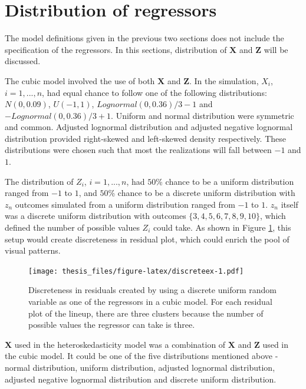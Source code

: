 \documentclass{monashthesis}
\theoremstyle{definition}
\theoremstyle{definition}
\theoremstyle{definition}
\theoremstyle{definition}
\theoremstyle{remark}
\begin{document}
\hypertarget{distribution-of-regressors}{%
\section{Distribution of regressors}\label{distribution-of-regressors}}

The model definitions given in the previous two sections does not include the specification of the regressors. In this sections, distribution of \(\boldsymbol{X}\) and \(\boldsymbol{Z}\) will be discussed.

The cubic model involved the use of both \(\boldsymbol{X}\) and \(\boldsymbol{Z}\). In the simulation, \(X_i\), \(i=1,...,n\), had equal chance to follow one of the following distributions: \(N(0, 0.09)\), \(U(-1, 1)\), \(Lognormal(0,0.36)/3 - 1\) and \(-Lognormal(0,0.36)/3 + 1\). Uniform and normal distribution were symmetric and common. Adjusted lognormal distribution and adjusted negative lognormal distribution provided right-skewed and left-skewed density respectively. These distributions were chosen such that most the realizations will fall between \(-1\) and \(1\).

The distribution of \(Z_i\), \(i=1,...,n\), had \(50\)\% chance to be a uniform distribution ranged from \(-1\) to \(1\), and \(50\)\% chance to be a discrete uniform distribution with \(z_n\) outcomes simulated from a uniform distribution ranged from \(-1\) to \(1\). \(z_n\) itself was a discrete uniform distribution with outcomes \(\{3,4,5,6,7,8,9,10\}\), which defined the number of possible values \(Z_i\) could take. As shown in Figure \ref{fig:discreteex}, this setup would create discreteness in residual plot, which could enrich the pool of visual patterns.

\begin{figure}
\centering
\texttt{[image: thesis\_files/figure-latex/discreteex-1.pdf]}
\caption{\label{fig:discreteex}Discreteness in residuals created by using a discrete uniform random variable as one of the regressors in a cubic model. For each residual plot of the lineup, there are three clusters because the number of possible values the regressor can take is three.}
\end{figure}

\(\boldsymbol{X}\) used in the heteroskedasticity model was a combination of \(\boldsymbol{X}\) and \(\boldsymbol{Z}\) used in the cubic model. It could be one of the five distributions mentioned above - normal distribution, uniform distribution, adjusted lognormal distribution, adjusted negative lognormal distribution and discrete uniform distribution.
\end{document}
